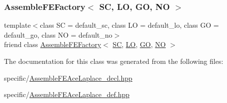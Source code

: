 \subsubsection{\texorpdfstring{Assemble\+F\+E\+Factory$<$ S\+C, L\+O, G\+O, N\+O $>$}{AssembleFEFactory< SC, LO, GO, NO >}}
{\footnotesize\ttfamily template$<$class SC  = default\+\_\+sc, class LO  = default\+\_\+lo, class GO  = default\+\_\+go, class NO  = default\+\_\+no$>$ \\
friend class \hyperlink{classFEDD_1_1AssembleFEFactory}{Assemble\+F\+E\+Factory}$<$ \hyperlink{fe__test__laplace_8cpp_a79c7e86a57edbb2a5a53242bcd04e41e}{SC}, \hyperlink{fe__test__laplace_8cpp_ad6a38c9f07d3fd633eefca5bccad8410}{LO}, \hyperlink{fe__test__laplace_8cpp_afa2946b509009b4f45eb04bd8c5b27d9}{GO}, \hyperlink{fe__test__laplace_8cpp_a5e24f37b28787429872b6ecb1d0417ce}{NO} $>$\hspace{0.3cm}{\ttfamily [friend]}}



The documentation for this class was generated from the following files\+:\begin{DoxyCompactItemize}
\item 
specific/\hyperlink{AssembleFEAceLaplace__decl_8hpp}{Assemble\+F\+E\+Ace\+Laplace\+\_\+decl.\+hpp}\item 
specific/\hyperlink{AssembleFEAceLaplace__def_8hpp}{Assemble\+F\+E\+Ace\+Laplace\+\_\+def.\+hpp}\end{DoxyCompactItemize}
